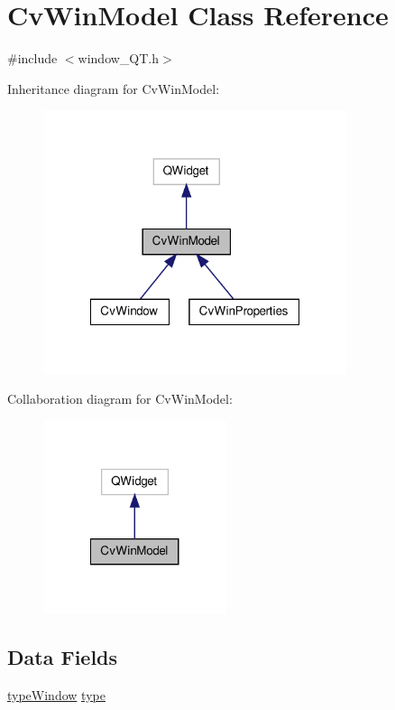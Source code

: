 \hypertarget{classCvWinModel}{\section{Cv\-Win\-Model Class Reference}
\label{classCvWinModel}
}


{\ttfamily \#include $<$window\-\_\-\-Q\-T.\-h$>$}



Inheritance diagram for Cv\-Win\-Model\-:
\nopagebreak
\begin{figure}[H]
\begin{center}
\leavevmode
\includegraphics[width=252pt]{classCvWinModel__inherit__graph}
\end{center}
\end{figure}


Collaboration diagram for Cv\-Win\-Model\-:
\nopagebreak
\begin{figure}[H]
\begin{center}
\leavevmode
\includegraphics[width=152pt]{classCvWinModel__coll__graph}
\end{center}
\end{figure}
\subsection*{Data Fields}
\begin{DoxyCompactItemize}
\item 
\hyperlink{window__QT_8h_a3ce3f41fe742c83e94d4cd007e7b4c70}{type\-Window} \hyperlink{classCvWinModel_a6b9598fed3bff14f0c10ec85a20ed83e}{type}
\end{DoxyCompactItemize}


